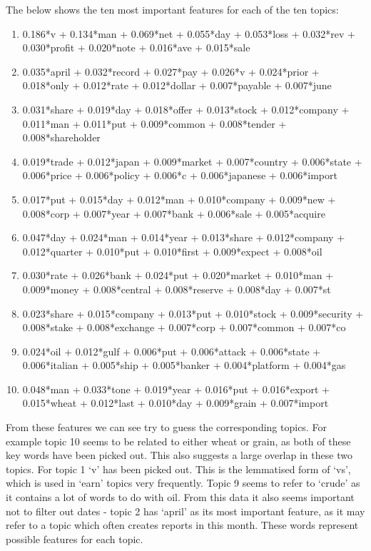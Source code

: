 \documentclass{article}
\begin{document}
The below shows the ten most important features for each of the ten topics:

\begin{enumerate}
\item 0.186*v + 0.134*man + 0.069*net + 0.055*day + 0.053*loss + 0.032*rev + 0.030*profit + 0.020*note + 0.016*ave + 0.015*sale
\item 0.035*april + 0.032*record + 0.027*pay + 0.026*v + 0.024*prior + 0.018*only + 0.012*rate + 0.012*dollar + 0.007*payable + 0.007*june
\item 0.031*share + 0.019*day + 0.018*offer + 0.013*stock + 0.012*company + 0.011*man + 0.011*put + 0.009*common + 0.008*tender + 0.008*shareholder
\item 0.019*trade + 0.012*japan + 0.009*market + 0.007*country + 0.006*state + 0.006*price + 0.006*policy + 0.006*c + 0.006*japanese + 0.006*import
\item 0.017*put + 0.015*day + 0.012*man + 0.010*company + 0.009*new + 0.008*corp + 0.007*year + 0.007*bank + 0.006*sale + 0.005*acquire
\item 0.047*day + 0.024*man + 0.014*year + 0.013*share + 0.012*company + 0.012*quarter + 0.010*put + 0.010*first + 0.009*expect + 0.008*oil
\item 0.030*rate + 0.026*bank + 0.024*put + 0.020*market + 0.010*man + 0.009*money + 0.008*central + 0.008*reserve + 0.008*day + 0.007*st
\item 0.023*share + 0.015*company + 0.013*put + 0.010*stock + 0.009*security + 0.008*stake + 0.008*exchange + 0.007*corp + 0.007*common + 0.007*co
\item 0.024*oil + 0.012*gulf + 0.006*put + 0.006*attack + 0.006*state + 0.006*italian + 0.005*ship + 0.005*banker + 0.004*platform + 0.004*gas
\item 0.048*man + 0.033*tone + 0.019*year + 0.016*put + 0.016*export + 0.015*wheat + 0.012*last + 0.010*day + 0.009*grain + 0.007*import
\end{enumerate}

From these features we can see try to guess the corresponding topics. For example topic 10 seems to be related to either wheat or grain, as both of these key words have been picked out. This also suggests a large overlap in these two topics. For topic 1 `v' has been picked out. This is the lemmatised form of `vs', which is used in `earn' topics very frequently. Topic 9 seems to refer to `crude' as it contains a lot of words to do with oil. From this data it also seems important not to filter out dates - topic 2 has `april' as its most important feature, as it may refer to a topic which often creates reports in this month. These words represent possible features for each topic.
\end{document}
